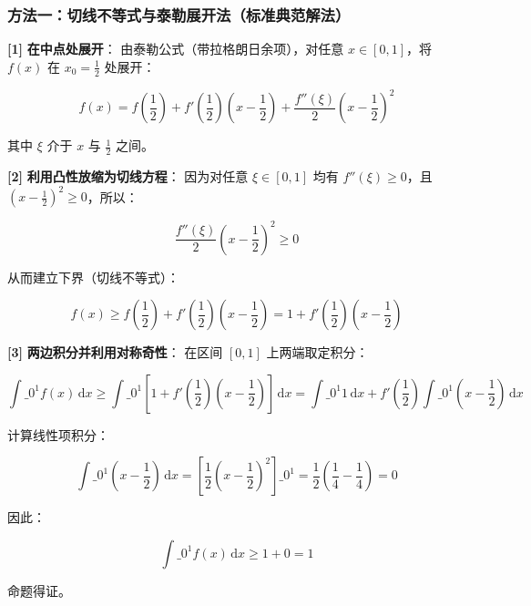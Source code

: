 \documentclass[11pt,a4paper,UTF8]{ctexart}
\begin{document}
\subsubsection{方法一：切线不等式与泰勒展开法（标准典范解法）}
\begin{solbox}[分步推导与答题规范]
\textbf{[1]}  \textbf{在中点处展开}：
由泰勒公式（带拉格朗日余项），对任意 $x \in [0, 1]$，将 $f(x)$ 在 $x_0 = \frac{1}{2}$ 处展开：

\begin{equation*}
f(x) = f\left(\frac{1}{2}\right) + f'\left(\frac{1}{2}\right)\left(x - \frac{1}{2}\right) + \frac{f''(\xi)}{2}\left(x - \frac{1}{2}\right)^2
\end{equation*}

其中 $\xi$ 介于 $x$ 与 $\frac{1}{2}$ 之间。

\textbf{[2]}  \textbf{利用凸性放缩为切线方程}：
因为对任意 $\xi \in [0, 1]$ 均有 $f''(\xi) \ge 0$，且 $\left(x - \frac{1}{2}\right)^2 \ge 0$，所以：

\begin{equation*}
\frac{f''(\xi)}{2}\left(x - \frac{1}{2}\right)^2 \ge 0
\end{equation*}

从而建立下界（切线不等式）：

\begin{equation*}
f(x) \ge f\left(\frac{1}{2}\right) + f'\left(\frac{1}{2}\right)\left(x - \frac{1}{2}\right) = 1 + f'\left(\frac{1}{2}\right)\left(x - \frac{1}{2}\right)
\end{equation*}


\textbf{[3]}  \textbf{两边积分并利用对称奇性}：
在区间 $[0, 1]$ 上两端取定积分：

\begin{equation*}
\int\_0^1 f(x)\,\mathrm{d}x \ge \int\_0^1 \left[ 1 + f'\left(\frac{1}{2}\right)\left(x - \frac{1}{2}\right) \right]\,\mathrm{d}x = \int\_0^1 1\,\mathrm{d}x + f'\left(\frac{1}{2}\right)\int\_0^1 \left(x - \frac{1}{2}\right)\,\mathrm{d}x
\end{equation*}

计算线性项积分：

\begin{equation*}
\int\_0^1 \left(x - \frac{1}{2}\right)\,\mathrm{d}x = \left[ \frac{1}{2}\left(x - \frac{1}{2}\right)^2 \right]\_0^1 = \frac{1}{2}\left( \frac{1}{4} - \frac{1}{4} \right) = 0
\end{equation*}

因此：

\begin{equation*}
\int\_0^1 f(x)\,\mathrm{d}x \ge 1 + 0 = 1
\end{equation*}

命题得证。
\end{solbox}
\end{document}
